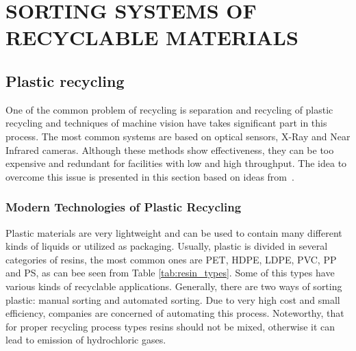 \documentclass{lutmscthesis}[2010/09/22]
\begin{document}
\section{ SORTING SYSTEMS OF RECYCLABLE MATERIALS }
\subsection{ Plastic recycling }

One of the common problem of recycling is separation and recycling
of plastic recycling and techniques
of machine vision have takes significant part in this
process. The most common systems are based on optical
sensors, X-Ray and Near Infrared cameras. Although
these methods show effectiveness, they can be too
expensive and redundant for facilities with low and
high throughput. The idea to overcome this issue
is presented in this section based on ideas from~\cite{Wahab:2006}.


\subsubsection*{ Modern Technologies of Plastic Recycling }

Plastic materials are very lightweight and can be used to
contain many different kinds of liquids or utilized as packaging.
Usually, plastic is divided in several categories of resins, the most common
ones are PET, HDPE, LDPE, PVC, PP and PS, as can bee seen from Table \ref{tab:resin_types}.
Some of this types have various kinds of recyclable applications.
Generally, there are two ways of sorting plastic: manual sorting and
automated sorting. Due to very high cost and small efficiency, companies are
concerned of automating this process. Noteworthy, that for proper recycling process
types resins should not be mixed, otherwise it can lead to
emission of hydrochloric gases.
\end{document}
